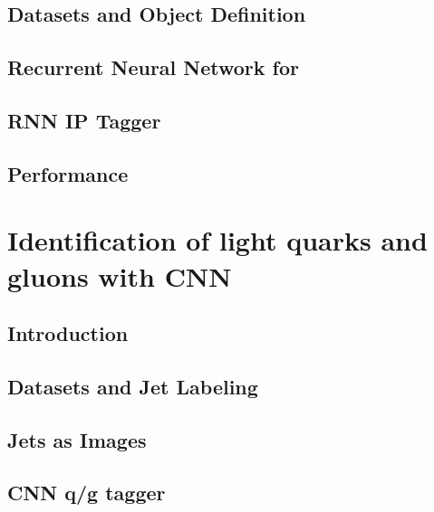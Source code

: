 \documentclass{report}
\begin{document}
\section{Datasets and Object Definition}

\clearpage

\section{Recurrent Neural Network for \btagging}

\clearpage

\section{RNN IP Tagger}

\clearpage

\section{Performance}


\clearpage


\chapter{Identification of light quarks and gluons with CNN}
\label{chap:qgtagging}
\section{Introduction}


\clearpage

\section{Datasets and Jet Labeling}

\clearpage

\section{Jets as Images}

\clearpage

%

\section{CNN q/g tagger}

\clearpage
\end{document}
